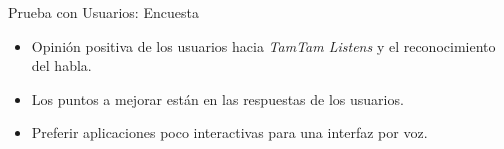 \begin{frame}{Prueba con Usuarios: Encuesta}

\begin{itemize}
    \item Opini\'on positiva de los usuarios hacia \emph{TamTam Listens} y el reconocimiento del habla.
    \item Los puntos a mejorar est\'an en las respuestas de los usuarios.
    \item Preferir aplicaciones poco interactivas para una interfaz por voz.
\end{itemize}

\end{frame}
